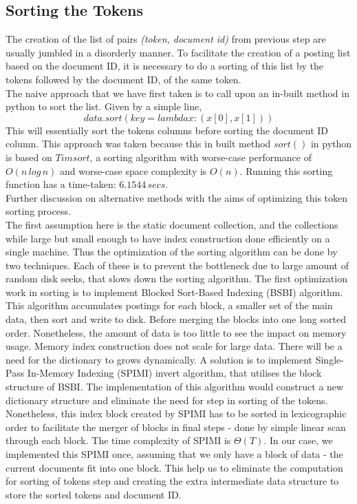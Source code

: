 \documentclass[journal]{IEEEtran}
\begin{document}
\subsection{Sorting the Tokens}
The creation of the list of pairs \textit{(token, document id)} from previous step are usually jumbled in a disorderly manner. To facilitate the creation of a posting list based on the document ID, it is necessary to do a sorting of this list by the tokens followed by the document ID, of the same token.\\
The naive approach that we have first taken is to call upon an in-built method in python to sort the list. Given by a simple line,
$$data.sort(key=lambda x:(x[0],x[1]))$$
This will essentially sort the tokens columns before sorting the document ID column.
This approach was taken because this in built method $sort()$ in python is based on $Timsort$, a sorting algorithm with worse-case performance of $O(n\,log\,n)$ and worse-case space complexity is $O(n)$. Running this sorting function has a time-taken: $6.1544\,secs$.\\
Further discussion on alternative methods with the aims of optimizing this token sorting process.
\vspace{2pt}\\
The first assumption here is the static document collection, and the collections while large but small enough to have index construction done efficiently on a single machine. Thus the optimization of the sorting algorithm can be done by two techniques. Each of these is to prevent the bottleneck due to large amount of random disk seeks, that slows down the sorting algorithm. The first optimization work in sorting is to implement Blocked Sort-Based Indexing (BSBI) algorithm. This algorithm accumulates postings for each block, a smaller set of the main data, then sort and write to disk. Before merging the blocks into one long sorted order. Nonetheless, the amount of data is too little to see the impact on memory usage. Memory index construction does not scale for large data. There will be a need for the dictionary to grows dynamically. A solution is to implement Single-Pass In-Memory Indexing (SPIMI) invert algorithm, that utilises the block structure of BSBI. The implementation of this algorithm would construct a new dictionary structure and eliminate the need for step in sorting of the tokens. Nonetheless, this index block created by SPIMI has to be sorted in lexicographic order to facilitate the merger of blocks in final steps - done by simple linear scan through each block. The time complexity of SPIMI is $\Theta(T)$. In our case, we implemented this SPIMI once, assuming that we only have a block of data - the current documents fit into one block. This help us to eliminate the computation for sorting of tokens step and creating the extra intermediate data structure to store the sorted tokens and document ID.
\end{document}
